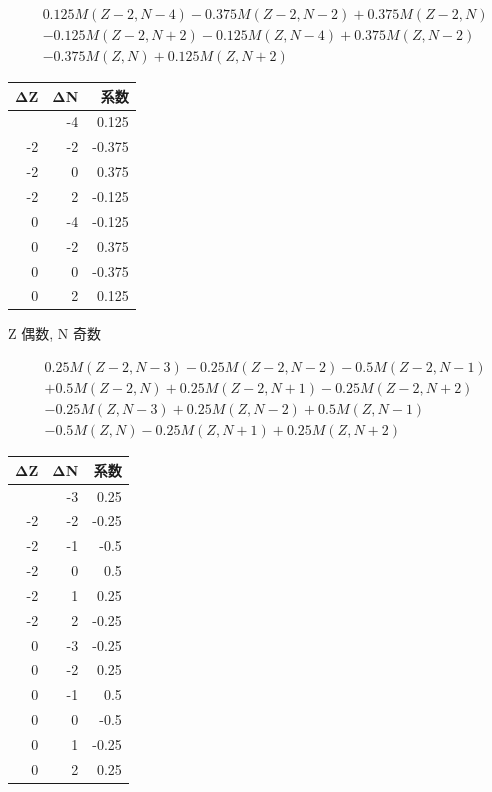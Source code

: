 \documentclass[
  11pt,
  letterpaper,
]{article}
\begin{document}
\[
\begin{aligned}
& 0.125M(Z-2,N-4)-0.375M(Z-2,N-2)+0.375M(Z-2,N) \\
& -0.125M(Z-2,N+2)-0.125M(Z,N-4)+0.375M(Z,N-2) \\
& -0.375M(Z,N)+0.125M(Z,N+2)
\end{aligned}
\]

\begin{longtable}[]{@{}rrr@{}}
\toprule\noalign{}
ΔZ & ΔN & 系数 \\
\midrule\noalign{}
\endhead
\bottomrule\noalign{}
\endlastfoot
-2 & -4 & 0.125 \\
-2 & -2 & -0.375 \\
-2 & 0 & 0.375 \\
-2 & 2 & -0.125 \\
0 & -4 & -0.125 \\
0 & -2 & 0.375 \\
0 & 0 & -0.375 \\
0 & 2 & 0.125 \\
\end{longtable}

Z 偶数, N 奇数

\[
\begin{aligned}
& 0.25M(Z-2,N-3)-0.25M(Z-2,N-2)-0.5M(Z-2,N-1) \\
& +0.5M(Z-2,N)+0.25M(Z-2,N+1)-0.25M(Z-2,N+2) \\
& -0.25M(Z,N-3)+0.25M(Z,N-2)+0.5M(Z,N-1) \\
& -0.5M(Z,N)-0.25M(Z,N+1)+0.25M(Z,N+2)
\end{aligned}
\]

\begin{longtable}[]{@{}rrr@{}}
\toprule\noalign{}
ΔZ & ΔN & 系数 \\
\midrule\noalign{}
\endhead
\bottomrule\noalign{}
\endlastfoot
-2 & -3 & 0.25 \\
-2 & -2 & -0.25 \\
-2 & -1 & -0.5 \\
-2 & 0 & 0.5 \\
-2 & 1 & 0.25 \\
-2 & 2 & -0.25 \\
0 & -3 & -0.25 \\
0 & -2 & 0.25 \\
0 & -1 & 0.5 \\
0 & 0 & -0.5 \\
0 & 1 & -0.25 \\
0 & 2 & 0.25 \\
\end{longtable}
\end{document}
